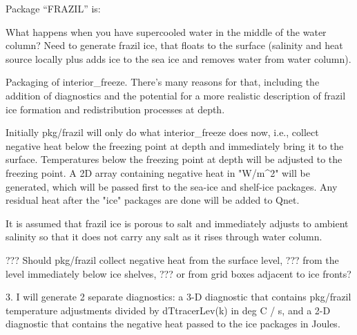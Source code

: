 
Package ``FRAZIL'' is:

What happens when you have supercooled water in the middle of the water
column?  Need to generate frazil ice, that floats to the surface (salinity and
heat source locally plus adds ice to the sea ice and removes water from water
column).

Packaging of interior_freeze.  There's many reasons for that, including the
addition of diagnostics and the potential for a more realistic description of
frazil ice formation and redistribution processes at depth.

Initially pkg/frazil will only do what interior_freeze does now, i.e., collect
negative heat below the freezing point at depth and immediately bring it to
the surface.  Temperatures below the freezing point at depth will be adjusted
to the freezing point.  A 2D array containing negative heat in "W/m^2" will be
generated, which will be passed first to the sea-ice and shelf-ice packages.
Any residual heat after the "ice" packages are done will be added to Qnet.

It is assumed that frazil ice is porous to salt and immediately adjusts to
ambient salinity so that it does not carry any salt as it rises through water
column.

??? Should pkg/frazil collect negative heat from the surface level,
??? from the level immediately below ice shelves,
??? or from grid boxes adjacent to ice fronts?

3. I will generate 2 separate diagnostics:
  a 3-D diagnostic that contains pkg/frazil temperature adjustments divided by dTtracerLev(k) in deg C / s,
  and a 2-D diagnostic that contains the negative heat passed to the ice packages in Joules.

